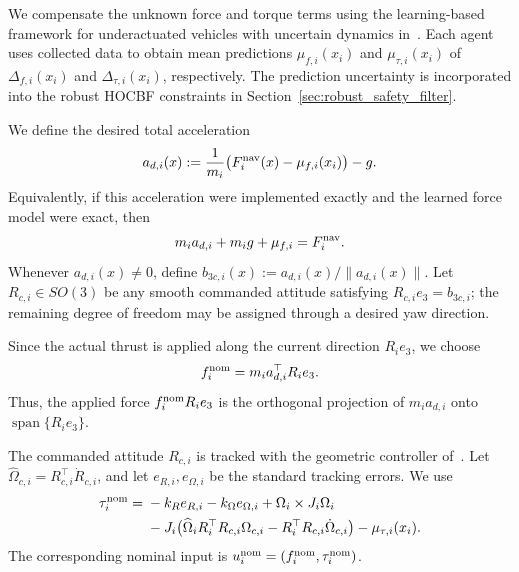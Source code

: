 \documentclass[journal,twoside,web]{ieeecolor}
\begin{document}
We compensate the unknown force and torque terms using the
learning-based framework for underactuated vehicles with
uncertain dynamics in~\cite{BeckersColomboHirchePappas2021CSL}. Each agent uses collected data to obtain mean predictions $\mu_{f,i}(x_i)$
and $\mu_{\tau,i}(x_i)$ of $\Delta_{f,i}(x_i)$ and
$\Delta_{\tau,i}(x_i)$, respectively. The prediction uncertainty is incorporated into the robust
HOCBF constraints in Section~\ref{sec:robust_safety_filter}. %

We define the desired total acceleration
\begin{equation}
    a_{d,i}(x)
    :=
    \frac{1}{m_i}
    \big(F_i^{\rm nav}(x)-\mu_{f,i}(x_i)\big)
    -
    g.
    \label{eq:desired_acceleration}
\end{equation}
Equivalently, if this acceleration were implemented exactly
and the learned force model were exact, then
\[
    m_i a_{d,i}+m_i g+\mu_{f,i}=F_i^{\rm nav}.
\]
Whenever \(a_{d,i}(x) \neq 0\), define
\(b_{3c,i}(x) := a_{d,i}(x)/\|a_{d,i}(x)\|\). Let
\(R_{c,i}\in SO(3)\) be any smooth commanded attitude satisfying
\(R_{c,i}e_3=b_{3c,i}\); the remaining degree of freedom may be
assigned through a desired yaw direction.

Since the actual thrust is applied along the current direction
$R_ie_3$, we choose
\begin{equation}
    f_i^{\rm nom}
    =
    m_i a_{d,i}^{\top}R_ie_3 .
    \label{eq:nominal_thrust}
\end{equation}
Thus, the applied force $f_i^{\rm nom}R_ie_3$ is the
orthogonal projection of $m_i a_{d,i}$ onto
$\operatorname{span}\{R_ie_3\}$.



The commanded attitude \(R_{c,i}\) is tracked with the geometric
controller of~\cite{lee2010geometric}. Let
\(\widehat\Omega_{c,i}=R_{c,i}^{\top}\dot R_{c,i}\), and let
\(e_{R,i},e_{\Omega,i}\) be the standard tracking errors. We use
\[
\begin{aligned}
\tau_i^{\rm nom}
={}&-k_Re_{R,i}-k_\Omega e_{\Omega,i}
+\Omega_i\times J_i\Omega_i\\
&-J_i\big(
\widehat\Omega_iR_i^\top R_{c,i}\Omega_{c,i}
-R_i^\top R_{c,i}\dot\Omega_{c,i}
\big)
-\mu_{\tau,i}(x_i).
\end{aligned}
\]
The corresponding nominal input is
\(u_i^{\rm nom}=(f_i^{\rm nom},\tau_i^{\rm nom})\).
\end{document}
